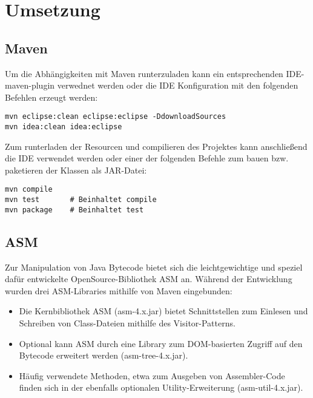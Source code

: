 
\chapter{Umsetzung}

\section{Maven}

Um die Abhängigkeiten mit Maven runterzuladen kann ein entsprechenden IDE-maven-plugin
verwednet werden oder die IDE Konfiguration mit den folgenden Befehlen erzeugt werden:

\begin{lstlisting}[basicstyle=\ttfamily,backgroundcolor=\color{source}]
mvn eclipse:clean eclipse:eclipse -DdownloadSources
mvn idea:clean idea:eclipse
\end{lstlisting}

\vspace{0.3cm}

Zum runterladen der Resourcen und compilieren des Projektes kann
anschließend die IDE verwendet werden oder einer der folgenden Befehle
zum bauen bzw. paketieren der Klassen als JAR-Datei:

\begin{lstlisting}[basicstyle=\ttfamily,backgroundcolor=\color{source}]
mvn compile
mvn test       # Beinhaltet compile
mvn package    # Beinhaltet test
\end{lstlisting}

\vspace{0.3cm}

\section{ASM}

Zur Manipulation von Java Bytecode bietet sich die leichtgewichtige und speziel
dafür entwickelte OpenSource-Bibliothek ASM an. Während der Entwicklung wurden
drei ASM-Libraries mithilfe von Maven eingebunden:

\begin{itemize}
\item Die Kernbibliothek ASM (asm-4.x.jar) bietet Schnittstellen zum Einlesen und Schreiben
		von Class-Dateien mithilfe des Visitor-Patterns.
\item Optional kann ASM durch eine Library zum DOM-basierten Zugriff auf den
		Bytecode erweitert werden (asm-tree-4.x.jar).
\item Häufig verwendete Methoden, etwa zum Ausgeben von Assembler-Code finden
		sich in der ebenfalls optionalen Utility-Erweiterung (asm-util-4.x.jar).
\end{itemize}


